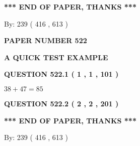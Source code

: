 \documentclass[12pt]{article}
\begin{document}
   
 \vspace{0.2in}
 
   
   
   
   
\vspace{1.0in} 
{\textbf{\large{ *** END OF PAPER, THANKS *** }}} 
   
   
\hspace{1.0in} By: 
 239 ( 416 ,  613 )
   
   
   
   
\newpage 
\setcounter{page}{ 
   522001 } 
   
   
   
   
 {\textbf{ \Large{ PAPER NUMBER  522  }}}
   
   
\vspace{0.2in}
   
   
   
   
   
   
 \vspace{0.2in}
{\LARGE {\textbf{ A QUICK TEST EXAMPLE}}}
   
   
  
\vspace{0.2in}
  
{\textbf{\Large{QUESTION
522.1 
 ( 1 , 1 , 101 )
}}}
  
  
 
 

$ %
38 +  %
47=   %
85$
 
 
  
\vspace{0.2in}
  
{\textbf{\Large{QUESTION
522.2 
 ( 2 , 2 , 201 )
}}}
  
  
   
   
 \vspace{0.2in}
 
   
   
   
   
\vspace{1.0in} 
{\textbf{\large{ *** END OF PAPER, THANKS *** }}} 
   
   
\hspace{1.0in} By: 
 239 ( 416 ,  613 )
   
   
   
   
\newpage 
\setcounter{page}{ 
   523001 } 
   
   
   
\end{document}
